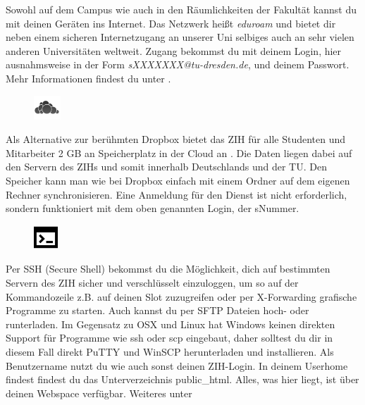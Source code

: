 Sowohl auf dem Campus wie auch in den Räumlichkeiten der Fakultät kannst du mit deinen Geräten ins Internet.
Das Netzwerk heißt \textit{eduroam} und bietet dir neben einem sicheren Internetzugang an unserer Uni selbiges auch an sehr vielen anderen Universitäten weltweit.
Zugang bekommst du mit deinem Login, hier ausnahmsweise in der Form \textit{sXXXXXXX@tu-dresden.de}, und deinem Passwort. Mehr Informationen findest du unter .

\newpage


\begin{figure}%
  \vspace{-0.5cm}%
  \centering%
  \includegraphics[width=1cm]{img/icons/owncloud.png}%
  \vspace{-0.5cm}%
\end{figure}

Als Alternative zur berühmten Dropbox bietet das ZIH für alle Studenten und Mitarbeiter 2 GB an Speicherplatz in der Cloud an . Die Daten liegen dabei auf den Servern des ZIHs und somit innerhalb Deutschlands und der TU. Den Speicher kann man wie bei Dropbox einfach mit einem Ordner auf dem eigenen Rechner synchronisieren. Eine Anmeldung für den Dienst ist nicht erforderlich, sondern funktioniert mit dem oben genannten Login, der sNummer.


\begin{figure}%
  \vspace{-0.4cm}%
  \centering%
  \includegraphics[width=0.9cm]{img/icons/prompt.pdf}%
  \vspace{-0.4cm}%
\end{figure}

Per SSH (Secure Shell) bekommst du die Möglichkeit, dich auf bestimmten Servern des ZIH sicher und verschlüsselt einzuloggen, um so auf der Kommandozeile z.B. auf deinen Slot zuzugreifen oder per X-Forwarding grafische Programme zu starten.
Auch kannst du per SFTP Dateien hoch- oder runterladen.
Im Gegensatz zu OSX und Linux hat Windows keinen direkten Support für Programme wie ssh oder scp eingebaut, daher solltest du dir in diesem Fall direkt PuTTY und WinSCP herunterladen und installieren.
Als Benutzername nutzt du wie auch sonst deinen ZIH-Login.
In deinem Userhome findest findest du das Unterverzeichnis public\_html.
Alles, was hier liegt, ist über deinen Webspace verfügbar. 
Weiteres unter 
\vfill

